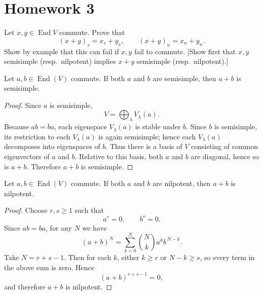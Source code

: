 \section{Homework 3}

\begin{exercise}
    Let $x,y \in \operatorname{End} V$ commute. Prove that
    \[
        (x+y)_s=x_s+y_s,
        \qquad
        (x+y)_n=x_n+y_n.
    \]
    Show by example that this can fail if $x,y$ fail to commute.
        [Show first that $x,y$ semisimple (resp.\ nilpotent) implies $x+y$ semisimple (resp.\ nilpotent).]
\end{exercise}

\begin{lemma}
    Let $a,b \in \operatorname{End}(V)$ commute. If both $a$ and $b$ are semisimple, then $a+b$ is semisimple.
\end{lemma}

\begin{proof}
    Since $a$ is semisimple,
    \[
        V=\bigoplus_{\lambda} V_\lambda(a).
    \]
    Because $ab=ba$, each eigenspace $V_\lambda(a)$ is stable under $b$. Since $b$ is semisimple, its restriction to each $V_\lambda(a)$ is again semisimple; hence each $V_\lambda(a)$ decomposes into eigenspaces of $b$. Thus there is a basis of $V$ consisting of common eigenvectors of $a$ and $b$. Relative to this basis, both $a$ and $b$ are diagonal, hence so is $a+b$. Therefore $a+b$ is semisimple.
\end{proof}

\begin{lemma}
    Let $a,b \in \operatorname{End}(V)$ commute. If both $a$ and $b$ are nilpotent, then $a+b$ is nilpotent.
\end{lemma}

\begin{proof}
    Choose $r,s \ge 1$ such that
    \[
        a^r=0,\qquad b^s=0.
    \]
    Since $ab=ba$, for any $N$ we have
    \[
        (a+b)^N=\sum_{k=0}^N \binom{N}{k} a^k b^{\,N-k}.
    \]
    Take $N=r+s-1$. Then for each $k$, either $k \ge r$ or $N-k \ge s$, so every term in the above sum is zero. Hence
    \[
        (a+b)^{r+s-1}=0,
    \]
    and therefore $a+b$ is nilpotent.
\end{proof}

